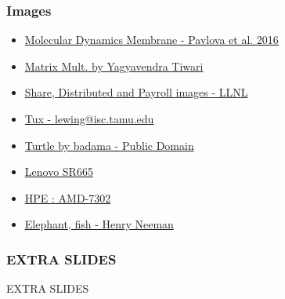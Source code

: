 \documentclass{beamer}
\begin{document}
\begin{frame}
\frametitle{Images}
\begin{itemize}
    \small
    \item \href{https://www.sciencedirect.com/science/article/pii/S0005273616300190}{\color{blue}Molecular Dynamics Membrane - Pavlova et al. 2016}
    \item \href{https://allinpython.com/matrix-multiplication-in-python-with-user-input/}{\color{blue}Matrix Mult. by Yagyavendra Tiwari}
    \item \href{https://hpc.llnl.gov/documentation/tutorials/introduction-parallel-computing-tutorial}{\color{blue}Share, Distributed and Payroll images - LLNL}
    \item \href{https://en.wikipedia.org/wiki/Tux_(mascot)\#/media/File:Tux.png}{\color{blue}Tux - lewing@isc.tamu.edu}
    \item \href{https://commons.wikimedia.org/wiki/File:Turtle_clip_art.svg}{\color{blue}Turtle by badama - Public Domain}
    \item \href{https://lenovopress.lenovo.com/lp1269-thinksystem-sr665-server}{\color{blue}Lenovo SR665}
    \item \href{https://buy.hpe.com/asia_pac/en/options/processors/amd-epyc-processors/amd-epyc-processors/amd-epyc-7302-3-0ghz-16-core-155w-processor-kit-for-hpe-proliant-xl225n-gen10-plus/p/p24264-b21}{\color{blue}HPE : AMD-7302}
    \item \href{https://shareok.org/bitstream/handle/11244/15465/sipe_overview.pdf?sequence=1&isAllowed=y}{\color{blue}Elephant, fish - Henry Neeman}
    \bigskip
\end{itemize}
\end{frame}

\begin{frame}
\frametitle{EXTRA SLIDES}
\large EXTRA SLIDES
\end{frame}
\end{document}
